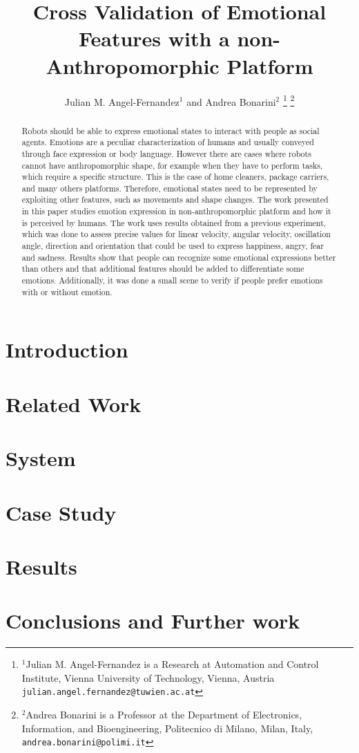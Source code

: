 \documentclass[letterpaper, 10 pt, conference]{ieeeconf}  %
\title{\LARGE \bf
Cross Validation of Emotional Features with a non-Anthropomorphic Platform
}
\author{Julian M. Angel-Fernandez$^{1}$ and Andrea Bonarini$^{2}$%
\thanks{$^{1}$Julian M. Angel-Fernandez is a Research at Automation and Control Institute, Vienna University of Technology, Vienna, Austria
        {\tt\small julian.angel.fernandez@tuwien.ac.at}}%
\thanks{$^{2}$Andrea Bonarini is a Professor at the Department of Electronics, Information, and Bioengineering, Politecnico di Milano, Milan, Italy,
        {\tt\small andrea.bonarini@polimi.it}}%
}
\begin{document}
\maketitle
\thispagestyle{empty}
\pagestyle{empty}


\begin{abstract}
Robots should be able to express emotional states to interact with people as social agents. Emotions are a peculiar characterization of humans and usually conveyed through face expression or body language. However there are cases where robots cannot have anthropomorphic shape, for example when they have to perform tasks, which require a specific structure. This is the case of home cleaners, package carriers, and many others platforms. Therefore, emotional states need to be represented by exploiting other features, such as movements and shape changes. The work presented in this paper studies emotion expression in non-anthropomorphic platform and how it is perceived by humans. The work uses results obtained from a previous experiment, which was done to assess precise values for linear velocity, angular velocity, oscillation angle, direction and orientation that could be used to express happiness, angry, fear and sadness. Results show that people can recognize some emotional expressions better than others and that additional features should be added to differentiate some emotions. Additionally, it was done a small scene to verify if people prefer emotions with or without emotion. 
\end{abstract}

\section{Introduction}

\label{sec:related_work}
\section{Related Work}

\section{System}
\label{sec:system}

\section{Case Study}
\label{sec:case}

\section{Results}
\label{sec:results}

\section{Conclusions and Further work}




\addtolength{\textheight}{-12cm}
\end{document}

